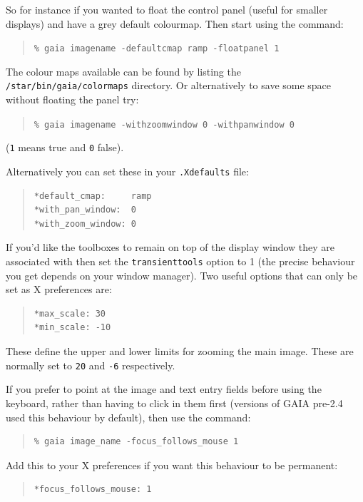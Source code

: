 \documentclass[twoside,11pt]{article}
\renewcommand{\_}{\texttt{\symbol{95}}}
\newcommand{\mytt}[1]{{\texttt{#1}}}
\begin{document}
So for instance if you wanted to float the control panel (useful for
smaller displays) and have a grey default colourmap. Then start
using the command:
\begin{quote}
\mytt{\% gaia image\_name -default\_cmap ramp -float\_panel 1}
\end{quote}
The colour maps available can be found by listing the
\mytt{/star/bin/gaia/colormaps} directory. Or alternatively to save
some space without floating the panel try:
\begin{quote}
\mytt{\% gaia image\_name -with\_zoom\_window 0 -with\_pan\_window 0}
\end{quote}
(\mytt{1} means true and \mytt{0} false).

Alternatively you can set these in your \mytt{.Xdefaults} file:
\begin{quote}
\begin{verbatim}
*default_cmap:     ramp
*with_pan_window:  0
*with_zoom_window: 0
\end{verbatim}
\end{quote}

If you'd like the toolboxes to remain on top of the display window
they are associated with then set the \mytt{transient\_tools} option
to 1 (the precise behaviour you get depends on your window
manager). Two useful options that can only be set as X preferences
are:
\begin{quote}
\begin{verbatim}
*max_scale: 30
*min_scale: -10
\end{verbatim}
\end{quote}
These define the upper and lower limits for zooming the main
image. These are normally set to \mytt{20} and \mytt{-6}
respectively.

If you prefer to point at the image and text entry fields before using
the keyboard, rather than having to click in them first (versions of
GAIA pre-2.4 used this behaviour by default), then use the command:
\begin{quote}
\begin{verbatim}
% gaia image_name -focus_follows_mouse 1
\end{verbatim}
\end{quote}
Add this to your X preferences if you want this behaviour to be
permanent:
\begin{quote}
\begin{verbatim}
*focus_follows_mouse: 1
\end{verbatim}
\end{quote}
\end{document}
